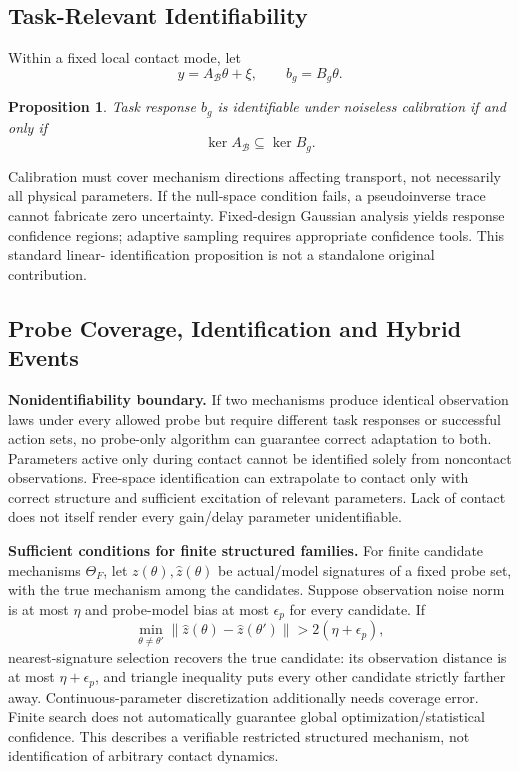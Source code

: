 \documentclass[11pt]{article}
\newtheorem{proposition}{Proposition}[section]
\begin{document}
\subsection{Task-Relevant Identifiability}
Within a fixed local contact mode, let
\begin{equation}
 y=A_{\mathcal B}\theta+\xi,\qquad b_g=B_g\theta.
\end{equation}
\begin{proposition}
Task response $b_g$ is identifiable under noiseless calibration if and only if
\begin{equation}
 \ker A_{\mathcal B}\subseteq\ker B_g.
\end{equation}
\end{proposition}
Calibration must cover mechanism directions affecting transport, not necessarily all
physical parameters. If the null-space condition fails, a pseudoinverse trace cannot
fabricate zero uncertainty. Fixed-design Gaussian analysis yields response confidence
regions; adaptive sampling requires appropriate confidence tools. This standard linear-
identification proposition is not a standalone original contribution.

\subsection{Probe Coverage, Identification and Hybrid Events}
\textbf{Nonidentifiability boundary.} If two mechanisms produce identical observation
laws under every allowed probe but require different task responses or successful
action sets, no probe-only algorithm can guarantee correct adaptation to both.
Parameters active only during contact cannot be identified solely from noncontact
observations. Free-space identification can extrapolate to contact only with correct
structure and sufficient excitation of relevant parameters. Lack of contact does
not itself render every gain/delay parameter unidentifiable.

\textbf{Sufficient conditions for finite structured families.} For finite candidate
mechanisms $\Theta_F$, let $z(\theta),\hat z(\theta)$ be actual/model signatures of
a fixed probe set, with the true mechanism among the candidates. Suppose observation
noise norm is at most $\eta$ and probe-model bias at most $\epsilon_p$ for every
candidate. If
\begin{equation}
 \min_{\theta\ne\theta'}\|\hat z(\theta)-\hat z(\theta')\|>2(\eta+\epsilon_p),
\end{equation}
nearest-signature selection recovers the true candidate: its observation distance
is at most $\eta+\epsilon_p$, and triangle inequality puts every other candidate
strictly farther away. Continuous-parameter discretization additionally needs coverage
error. Finite search does not automatically guarantee global optimization/statistical
confidence. This describes a verifiable restricted structured mechanism, not identification
of arbitrary contact dynamics.
\end{document}
